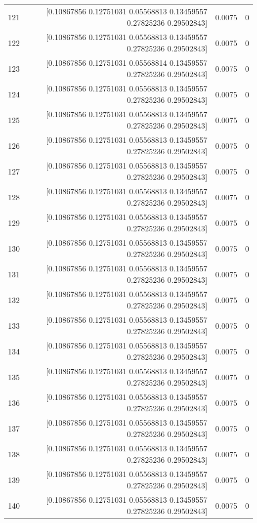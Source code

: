 \begin{longtable}{lrrr}
121 & [0.10867856 0.12751031 0.05568813 0.13459557 0.27825236 0.29502843] & 0.0075 & 0 \\
122 & [0.10867856 0.12751031 0.05568813 0.13459557 0.27825236 0.29502843] & 0.0075 & 0 \\
123 & [0.10867856 0.12751031 0.05568814 0.13459557 0.27825236 0.29502843] & 0.0075 & 0 \\
124 & [0.10867856 0.12751031 0.05568813 0.13459557 0.27825236 0.29502843] & 0.0075 & 0 \\
125 & [0.10867856 0.12751031 0.05568813 0.13459557 0.27825236 0.29502843] & 0.0075 & 0 \\
126 & [0.10867856 0.12751031 0.05568813 0.13459557 0.27825236 0.29502843] & 0.0075 & 0 \\
127 & [0.10867856 0.12751031 0.05568813 0.13459557 0.27825236 0.29502843] & 0.0075 & 0 \\
128 & [0.10867856 0.12751031 0.05568813 0.13459557 0.27825236 0.29502843] & 0.0075 & 0 \\
129 & [0.10867856 0.12751031 0.05568813 0.13459557 0.27825236 0.29502843] & 0.0075 & 0 \\
130 & [0.10867856 0.12751031 0.05568813 0.13459557 0.27825236 0.29502843] & 0.0075 & 0 \\
131 & [0.10867856 0.12751031 0.05568813 0.13459557 0.27825236 0.29502843] & 0.0075 & 0 \\
132 & [0.10867856 0.12751031 0.05568813 0.13459557 0.27825236 0.29502843] & 0.0075 & 0 \\
133 & [0.10867856 0.12751031 0.05568813 0.13459557 0.27825236 0.29502843] & 0.0075 & 0 \\
134 & [0.10867856 0.12751031 0.05568813 0.13459557 0.27825236 0.29502843] & 0.0075 & 0 \\
135 & [0.10867856 0.12751031 0.05568813 0.13459557 0.27825236 0.29502843] & 0.0075 & 0 \\
136 & [0.10867856 0.12751031 0.05568813 0.13459557 0.27825236 0.29502843] & 0.0075 & 0 \\
137 & [0.10867856 0.12751031 0.05568813 0.13459557 0.27825236 0.29502843] & 0.0075 & 0 \\
138 & [0.10867856 0.12751031 0.05568813 0.13459557 0.27825236 0.29502843] & 0.0075 & 0 \\
139 & [0.10867856 0.12751031 0.05568813 0.13459557 0.27825236 0.29502843] & 0.0075 & 0 \\
140 & [0.10867856 0.12751031 0.05568813 0.13459557 0.27825236 0.29502843] & 0.0075 & 0 \\

\end{longtable}
